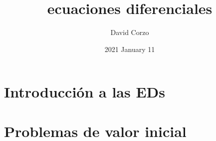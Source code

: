 \documentclass[openany]{book}
\title{ecuaciones diferenciales}
\date{2021 January 11} %
\author{David Corzo}
\begin{document}
\maketitle
\tableofcontents

\chapter{Introducción a las EDs}


\chapter{Problemas de valor inicial}



\end{document}
